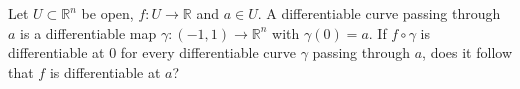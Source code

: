 Let $U\subset\mathbb R^n$ be open, $f:U\to\mathbb R$ and $a\in U$. A differentiable curve passing through $a$ is a differentiable map $\gamma:(-1,1)\to\mathbb R^n$ with $\gamma(0)=a$. If $f\circ\gamma$ is differentiable at $0$ for every differentiable curve $\gamma$ passing through $a$, does it follow that $f$ is differentiable at $a$?
